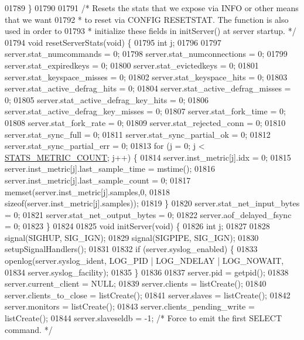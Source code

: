 \begin{DoxyCode}
{{{{{{{{{{{{{{{{{{{{{{{{{{01789 \}
01790 
01791 \textcolor{comment}{/* Resets the stats that we expose via INFO or other means that we want}
01792 \textcolor{comment}{ * to reset via CONFIG RESETSTAT. The function is also used in order to}
01793 \textcolor{comment}{ * initialize these fields in initServer() at server startup. */}
01794 \textcolor{keywordtype}{void} resetServerStats(\textcolor{keywordtype}{void}) \{
01795     \textcolor{keywordtype}{int} j;
01796 
01797     server.stat\_numcommands = 0;
01798     server.stat\_numconnections = 0;
01799     server.stat\_expiredkeys = 0;
01800     server.stat\_evictedkeys = 0;
01801     server.stat\_keyspace\_misses = 0;
01802     server.stat\_keyspace\_hits = 0;
01803     server.stat\_active\_defrag\_hits = 0;
01804     server.stat\_active\_defrag\_misses = 0;
01805     server.stat\_active\_defrag\_key\_hits = 0;
01806     server.stat\_active\_defrag\_key\_misses = 0;
01807     server.stat\_fork\_time = 0;
01808     server.stat\_fork\_rate = 0;
01809     server.stat\_rejected\_conn = 0;
01810     server.stat\_sync\_full = 0;
01811     server.stat\_sync\_partial\_ok = 0;
01812     server.stat\_sync\_partial\_err = 0;
01813     \textcolor{keywordflow}{for} (j = 0; j < \hyperlink{server_8h_ad9e350cb5eeb396592d0d80f70e6e040}{STATS\_METRIC\_COUNT}; j++) \{
01814         server.inst\_metric[j].idx = 0;
01815         server.inst\_metric[j].last\_sample\_time = mstime();
01816         server.inst\_metric[j].last\_sample\_count = 0;
01817         memset(server.inst\_metric[j].samples,0,
01818             \textcolor{keyword}{sizeof}(server.inst\_metric[j].samples));
01819     \}
01820     server.stat\_net\_input\_bytes = 0;
01821     server.stat\_net\_output\_bytes = 0;
01822     server.aof\_delayed\_fsync = 0;
01823 \}
01824 
01825 \textcolor{keywordtype}{void} initServer(\textcolor{keywordtype}{void}) \{
01826     \textcolor{keywordtype}{int} j;
01827 
01828     signal(SIGHUP, SIG\_IGN);
01829     signal(SIGPIPE, SIG\_IGN);
01830     setupSignalHandlers();
01831 
01832     \textcolor{keywordflow}{if} (server.syslog\_enabled) \{
01833         openlog(server.syslog\_ident, LOG\_PID | LOG\_NDELAY | LOG\_NOWAIT,
01834             server.syslog\_facility);
01835     \}
01836 
01837     server.pid = getpid();
01838     server.current\_client = NULL;
01839     server.clients = listCreate();
01840     server.clients\_to\_close = listCreate();
01841     server.slaves = listCreate();
01842     server.monitors = listCreate();
01843     server.clients\_pending\_write = listCreate();
01844     server.slaveseldb = -1; \textcolor{comment}{/* Force to emit the first SELECT command. */}
}}}}}}}}}}}}}}}}}}}}}}}}}}
\end{DoxyCode}
